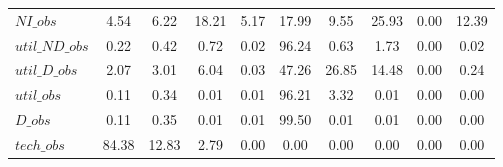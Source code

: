 \begin{center}
\begin{longtable}{lccccccccc}
$NI\_obs        $	 & 	         4.54	 & 	         6.22	 & 	        18.21	 & 	         5.17	 & 	        17.99	 & 	         9.55	 & 	        25.93	 & 	         0.00	 & 	        12.39 \\ 
$util\_ND\_obs  $	 & 	         0.22	 & 	         0.42	 & 	         0.72	 & 	         0.02	 & 	        96.24	 & 	         0.63	 & 	         1.73	 & 	         0.00	 & 	         0.02 \\ 
$util\_D\_obs   $	 & 	         2.07	 & 	         3.01	 & 	         6.04	 & 	         0.03	 & 	        47.26	 & 	        26.85	 & 	        14.48	 & 	         0.00	 & 	         0.24 \\ 
$util\_obs      $	 & 	         0.11	 & 	         0.34	 & 	         0.01	 & 	         0.01	 & 	        96.21	 & 	         3.32	 & 	         0.01	 & 	         0.00	 & 	         0.00 \\ 
$D\_obs         $	 & 	         0.11	 & 	         0.35	 & 	         0.01	 & 	         0.01	 & 	        99.50	 & 	         0.01	 & 	         0.01	 & 	         0.00	 & 	         0.00 \\ 
$tech\_obs      $	 & 	        84.38	 & 	        12.83	 & 	         2.79	 & 	         0.00	 & 	         0.00	 & 	         0.00	 & 	         0.00	 & 	         0.00	 & 	         0.00 \\ 
\end{longtable}
 \end{center}

